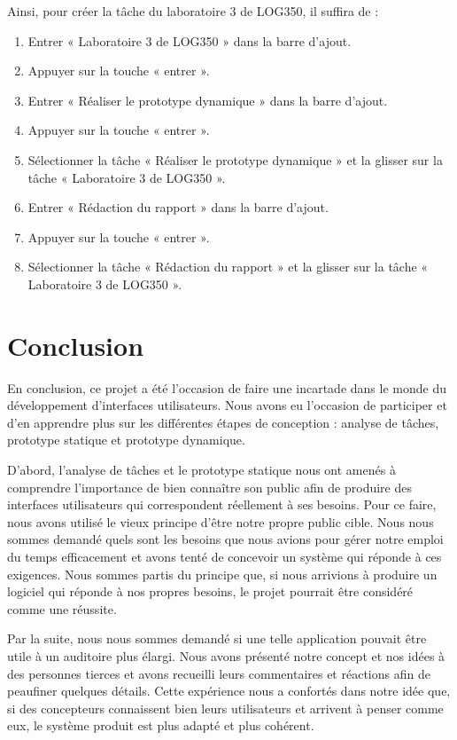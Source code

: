 \documentclass[letterpaper, oneside, 12pt, these, creativecommons]{thETS}
\begin{document}
Ainsi, pour créer la tâche du laboratoire 3 de LOG350, il suffira de :

\begin{enumerate}
    \item Entrer « Laboratoire 3 de LOG350 » dans la barre d'ajout.
    \item Appuyer sur la touche « entrer ».
    \item Entrer « Réaliser le prototype dynamique » dans la barre d'ajout.
    \item Appuyer sur la touche « entrer ».
    \item Sélectionner la tâche « Réaliser le prototype dynamique » et la glisser sur la tâche « Laboratoire 3 de LOG350 ».
    \item Entrer « Rédaction du rapport » dans la barre d'ajout.
    \item Appuyer sur la touche « entrer ».
    \item Sélectionner la tâche « Rédaction du rapport » et la glisser sur la tâche « Laboratoire 3 de LOG350 ».
\end{enumerate}

\chapter{Conclusion}

En conclusion, ce projet a été l'occasion de faire une incartade dans le monde du développement d'interfaces utilisateurs. Nous avons eu l'occasion de participer et d'en apprendre plus sur les différentes étapes de conception : analyse de tâches, prototype statique et prototype dynamique.

D'abord, l'analyse de tâches et le prototype statique nous ont amenés à comprendre l'importance de bien connaître son public afin de produire des interfaces utilisateurs qui correspondent réellement à ses besoins. Pour ce faire, nous avons utilisé le vieux principe d'être notre propre public cible. Nous nous sommes demandé quels sont les besoins que nous avions pour gérer notre emploi du temps efficacement et avons tenté de concevoir un système qui réponde à ces exigences. Nous sommes partis du principe que, si nous arrivions à produire un logiciel qui réponde à nos propres besoins, le projet pourrait être considéré comme une réussite.

Par la suite, nous nous sommes demandé si une telle application pouvait être utile à un auditoire plus élargi. Nous avons présenté notre concept et nos idées à des personnes tierces et avons recueilli leurs commentaires et réactions afin de peaufiner quelques détails. Cette expérience nous a confortés dans notre idée que, si des concepteurs connaissent bien leurs utilisateurs et arrivent à penser comme eux, le système produit est plus adapté et plus cohérent.
\end{document}
